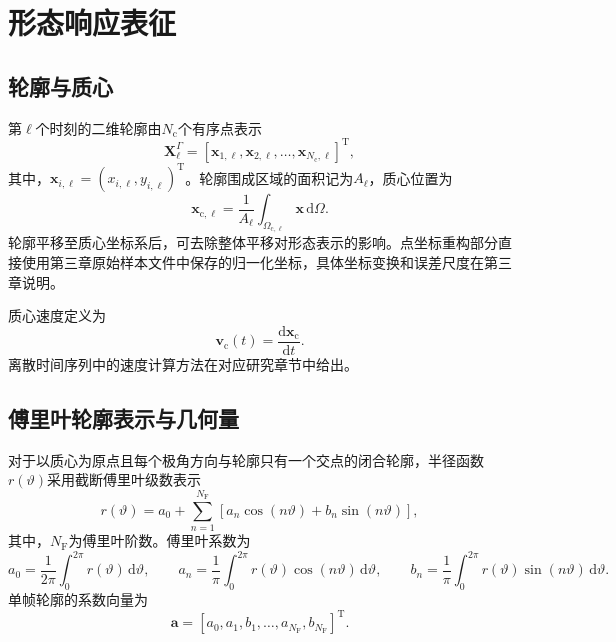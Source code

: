 \section{形态响应表征}

\subsection{轮廓与质心}

第$\ell$个时刻的二维轮廓由$N_{\mathrm c}$个有序点表示
\begin{equation}
\boldsymbol{X}_{\ell}^{\Gamma}
=
\left[
\boldsymbol{x}_{1,\ell},
\boldsymbol{x}_{2,\ell},
\ldots,
\boldsymbol{x}_{N_{\mathrm c},\ell}
\right]^{\mathrm T},
\label{eq:ch2_contour_matrix}
\end{equation}
其中，$\boldsymbol{x}_{i,\ell}=(x_{i,\ell},y_{i,\ell})^{\mathrm T}$。轮廓围成区域的面积记为$A_{\ell}$，质心位置为
\begin{equation}
\boldsymbol{x}_{\mathrm c,\ell}
=
\frac{1}{A_{\ell}}
\int_{\Omega_{\mathrm c,\ell}}
\boldsymbol{x}\,\mathrm d\Omega.
\label{eq:ch2_centroid}
\end{equation}
轮廓平移至质心坐标系后，可去除整体平移对形态表示的影响。点坐标重构部分直接使用第三章原始样本文件中保存的归一化坐标，具体坐标变换和误差尺度在第三章说明。

质心速度定义为
\begin{equation}
\boldsymbol{v}_{\mathrm c}(t)
=
\frac{\mathrm d\boldsymbol{x}_{\mathrm c}}{\mathrm dt}.
\label{eq:ch2_centroid_velocity}
\end{equation}
离散时间序列中的速度计算方法在对应研究章节中给出。

\subsection{傅里叶轮廓表示与几何量}

对于以质心为原点且每个极角方向与轮廓只有一个交点的闭合轮廓，半径函数$r(\vartheta)$采用截断傅里叶级数表示
\begin{equation}
r(\vartheta)
=
a_0
+
\sum_{n=1}^{N_{\mathrm F}}
\left[
a_n\cos(n\vartheta)
+
b_n\sin(n\vartheta)
\right],
\label{eq:ch2_fourier_contour}
\end{equation}
其中，$N_{\mathrm F}$为傅里叶阶数。傅里叶系数为
\begin{equation}
a_0
=
\frac{1}{2\pi}\int_0^{2\pi}r(\vartheta)\,\mathrm d\vartheta,
\qquad
a_n
=
\frac{1}{\pi}\int_0^{2\pi}r(\vartheta)\cos(n\vartheta)\,\mathrm d\vartheta,
\qquad
b_n
=
\frac{1}{\pi}\int_0^{2\pi}r(\vartheta)\sin(n\vartheta)\,\mathrm d\vartheta.
\label{eq:ch2_fourier_coefficients}
\end{equation}
单帧轮廓的系数向量为
\begin{equation}
\boldsymbol{a}
=
\left[
a_0,a_1,b_1,\ldots,a_{N_{\mathrm F}},b_{N_{\mathrm F}}
\right]^{\mathrm T}.
\label{eq:ch2_fourier_vector}
\end{equation}

